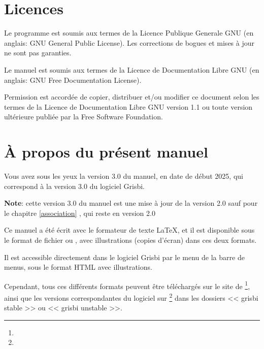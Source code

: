 \section{Licences\label{introduction-licenses}}


Le programme est soumis aux termes de la \gls{Licence Publique Generale GNU} (en anglais: \gls{GNU General Public License}). Les corrections de bogues et mises à jour ne sont pas garanties.

Le manuel est soumis aux termes de la \gls{Licence de Documentation Libre GNU} (en anglais: \gls{GNU Free Documentation License}).

Permission est accordée de copier, distribuer et/ou modifier ce document selon les termes de la Licence de Documentation Libre GNU version 1.1 ou toute version ultérieure publiée par la \gls{Free Software Foundation}.


\section{À propos du présent manuel\label{introduction-manual}}


Vous avez sous les yeux la version \actuality{}3.0 du manuel, en date de \actuality{}début 2025, qui correspond à la version 3.0 du logiciel Grisbi.


\textbf{Note}: cette version 3.0 du manuel est une mise à jour de la version 2.0 sauf pour le chapitre \vref{association} , qui reste en version 2.0 %


Ce manuel a été écrit avec le \gls{formateur de texte} \gls{LaTeX}, et il est disponible sous le \gls{format de fichier}  ou , avec illustrations (copies d'écran) dans ces deux formats. 

Il est accessible directement dans le logiciel Grisbi par le menu  de la barre de menus, sous le format \gls{HTML} avec illustrations.

Cependant, tous ces différents formats peuvent être téléchargés sur le site de \footnote{\urlSourceForgeDocumentation{}}, ainsi que les versions correspondantes du logiciel sur \footnote{\urlSourceForge{}} dans les dossiers << \textsf{grisbi stable} >> ou << \textsf{grisbi unstable} >>.

